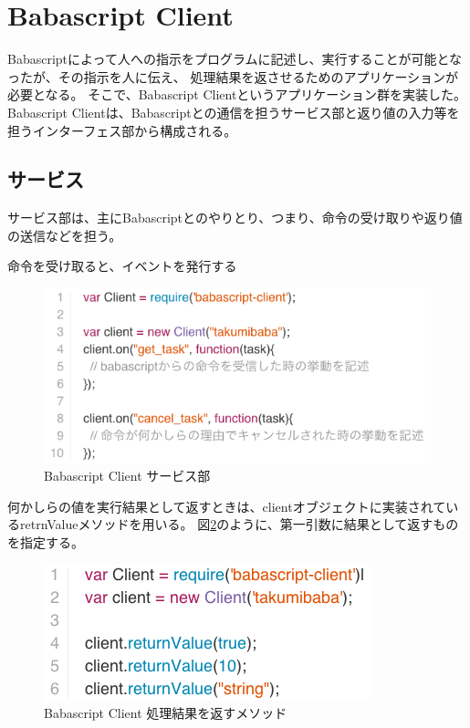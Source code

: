 \section{Babascript Client}\label{babascript-client}

Babascriptによって人への指示をプログラムに記述し、実行することが可能となったが、その指示を人に伝え、
処理結果を返させるためのアプリケーションが必要となる。
そこで、Babascript Clientというアプリケーション群を実装した。 Babascript
Clientは、Babascriptとの通信を担うサービス部と返り値の入力等を担うインターフェス部から構成される。

\subsection{サービス}\label{ux30b5ux30fcux30d3ux30b9}

サービス部は、主にBabascriptとのやりとり、つまり、命令の受け取りや返り値の送信などを担う。

命令を受け取ると、イベントを発行する

\begin{figure}[htbp]
  \begin{center}
  \includegraphics[width=.8\linewidth,bb=0 0 560 253]{images/babascript_client_service.js.png}
  \end{center}
  \caption{Babascript Client サービス部}
  \label{fig:babascript_client_service}
\end{figure}

何かしらの値を実行結果として返すときは、clientオブジェクトに実装されているretrnValueメソッドを用いる。
図\ref{fig:babascript_client_service_returnvalue}のように、第一引数に結果として返すものを指定する。

\begin{figure}[htbp]
  \begin{center}
  \includegraphics[width=.8\linewidth,bb=0 0 357 149]{images/babascript_client_service_returnvalue.js.png}
  \end{center}
  \caption{Babascript Client 処理結果を返すメソッド}
  \label{fig:babascript_client_service_returnvalue}
\end{figure}

